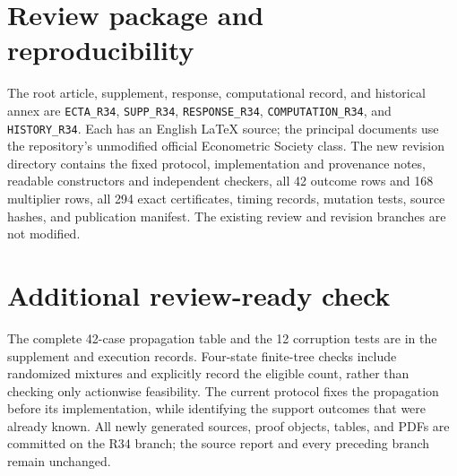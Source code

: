 \section{Review package and reproducibility}
The root article, supplement, response, computational record, and historical annex are \texttt{ECTA\_R34}, \texttt{SUPP\_R34}, \texttt{RESPONSE\_R34}, \texttt{COMPUTATION\_R34}, and \texttt{HISTORY\_R34}. Each has an English LaTeX source; the principal documents use the repository's unmodified official Econometric Society class. The new revision directory contains the fixed protocol, implementation and provenance notes, readable constructors and independent checkers, all 42 outcome rows and 168 multiplier rows, all 294 exact certificates, timing records, mutation tests, source hashes, and publication manifest. The existing review and revision branches are not modified.

\section{Additional review-ready check}
The complete 42-case propagation table and the 12 corruption tests are in the supplement and execution records. Four-state finite-tree checks include randomized mixtures and explicitly record the eligible count, rather than checking only actionwise feasibility. The current protocol fixes the propagation before its implementation, while identifying the support outcomes that were already known. All newly generated sources, proof objects, tables, and PDFs are committed on the R34 branch; the source report and every preceding branch remain unchanged.
